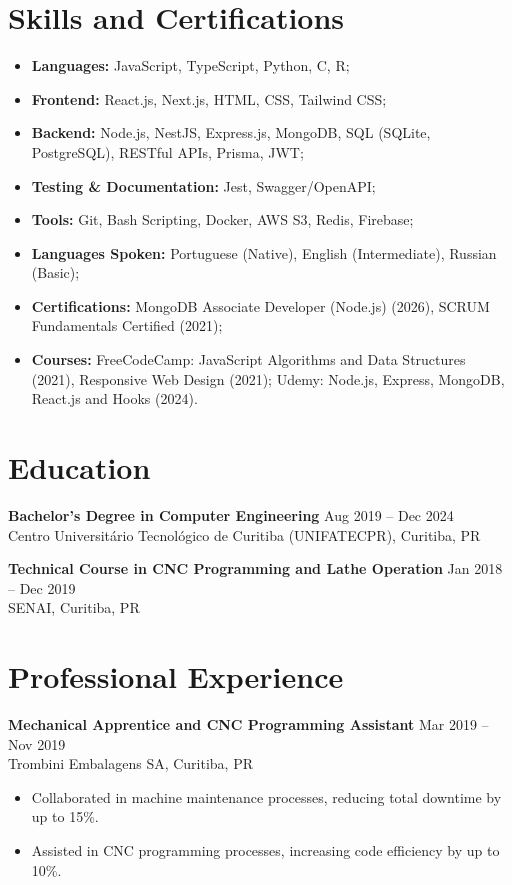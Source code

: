 \documentclass[a4paper, 10pt]{article}
\begin{document}
\section{Skills and Certifications}
\begin{itemize}
    \item \textbf{Languages:} JavaScript, TypeScript, Python, C, R;
    \item \textbf{Frontend:} React.js, Next.js, HTML, CSS, Tailwind CSS;
    \item \textbf{Backend:} Node.js, NestJS, Express.js, MongoDB, SQL (SQLite, PostgreSQL), RESTful APIs, Prisma, JWT;
    \item \textbf{Testing \& Documentation:} Jest, Swagger/OpenAPI;
    \item \textbf{Tools:} Git, Bash Scripting, Docker, AWS S3, Redis, Firebase;
    \item \textbf{Languages Spoken:} Portuguese (Native), English (Intermediate), Russian (Basic);
    \item \textbf{Certifications:} MongoDB Associate Developer (Node.js) (2026), SCRUM Fundamentals Certified (2021);
    \item \textbf{Courses:} FreeCodeCamp: JavaScript Algorithms and Data Structures (2021), Responsive Web Design (2021); Udemy: Node.js, Express, MongoDB, React.js and Hooks (2024).
\end{itemize}

\section{Education}
\textbf{Bachelor's Degree in Computer Engineering} \hfill Aug 2019 -- Dec 2024 \\
Centro Universitário Tecnológico de Curitiba (UNIFATECPR), Curitiba, PR

\medskip
\textbf{Technical Course in CNC Programming and Lathe Operation} \hfill Jan 2018 -- Dec 2019 \\
SENAI, Curitiba, PR

\section{Professional Experience}
\textbf{Mechanical Apprentice and CNC Programming Assistant} \hfill Mar 2019 -- Nov 2019 \\
Trombini Embalagens SA, Curitiba, PR
\begin{itemize}
    \item Collaborated in machine maintenance processes, reducing total downtime by up to 15\%.
    \item Assisted in CNC programming processes, increasing code efficiency by up to 10\%.
\end{itemize}
\end{document}
